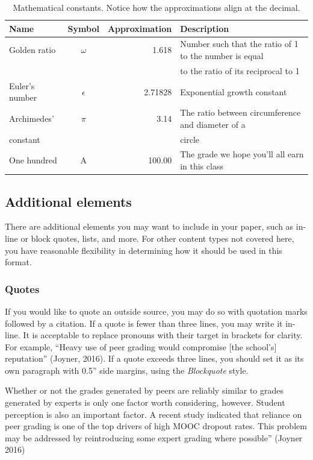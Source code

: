 {{{{\begin{table}[H]
  \centering
  \caption{Mathematical constants. Notice how the approximations align at the decimal.}
  \label{table:1}
  \begin{tabular}{@{}lcrl@{}}
    \textbf{Name} & \textbf{Symbol} & \textbf{Approximation} & \textbf{Description}\\
    \midrule
    Golden ratio & $\omega$ & 1.618 & Number such that the ratio of 1 to the number is equal\\
    & & & to the ratio of its reciprocal to 1\\
    \midrule
    Euler's number & $\epsilon$ & 2.71828 & Exponential growth constant\\
    \midrule
    Archimedes' & $\pi$ & 3.14 & The ratio between circumference and diameter of a\\
    constant & & & circle\\
    \midrule
    One hundred & A\super{+} & 100.00 & The grade we hope you'll all earn in this class
  \end{tabular}
\end{table}

\subsection{Additional elements}
There are additional elements you may want to include in your paper, such as in-line or block quotes, lists, and more. For other content types not covered here, you have reasonable flexibility in determining how it should be used in this format.

\subsubsection{Quotes}
If you would like to quote an outside source, you may do so with quotation marks followed by a citation. If a quote is fewer than three lines, you may write it in-line. It is acceptable to replace pronouns with their target in brackets for clarity. For example, “Heavy use of peer grading would compromise [the school’s] reputation” (Joyner, 2016). If a quote exceeds three lines, you should set it as its own paragraph with 0.5'' side margins, using the \emph{Blockquote} style.

\begin{quoting}
Whether or not the grades generated by peers are reliably similar to grades
generated by experts is only one factor worth considering, however. Student
perception is also an important factor. A recent study indicated that reliance
on peer grading is one of the top drivers of high MOOC dropout rates. This
problem may be addressed by reintroducing some expert grading where possible''
(Joyner 2016)
\end{quoting}

}}}}
